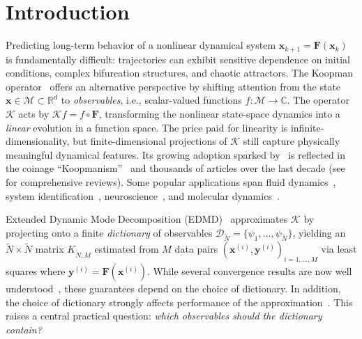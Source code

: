\documentclass{article}
\theoremstyle{plain}
\theoremstyle{definition}
\def\R{\mathbb{R}}
\def\C{\mathbb{C}}
\def\x{\mathbf{x}}
\def\Koop{\mathcal{K}}
\def\Dc{\mathcal{D}}
\def\Mc{\mathcal{M}}
\newcommand{\arXivtag}[1][]{#1}
\begin{document}
	\section{Introduction}\label{sec:intro}
	Predicting long-term behavior of a nonlinear dynamical system $\x_{k+1}=\mathbf{F}(\x_k)$ is fundamentally difficult: trajectories can exhibit sensitive dependence on initial conditions, complex bifurcation structures, and chaotic attractors. 
    The Koopman operator~\cite{koopman1931hamiltonian, Koopman-Neumann1932} offers an alternative perspective by shifting attention from the state $\x \in \Mc \subset \R^d$ to \emph{observables}, i.e., scalar-valued functions $f:\Mc \to \C$. The operator $\Koop$ acts by $\Koop f = f \circ \mathbf{F}$, transforming the nonlinear state-space dynamics into a \emph{linear} evolution in a function space. The price paid for linearity is infinite-dimensionality, but finite-dimensional projections of $\Koop$ still capture physically meaningful dynamical features.
    \arXivtag[Its growing adoption sparked by~\cite{mezic2004PhysicD, mezic2005NonDyn} is reflected in the coinage ``Koopmanism''~\cite{Budisic2012Koopmanism} and thousands of articles over the last decade (see~\cite{Mezic2013AnnRevFluid, Schmid2022DMDreview, Brunton2022SIAMReviews, Colbrook2024-MultiverseDMD, Colbrook2026} for comprehensive reviews). Some popular applications span fluid dynamics~\cite{Mezic2013AnnRevFluid}, system identification~\cite{brunton2016SINDy}, neuroscience~\cite{brunton2016neuro}, and molecular dynamics~\cite{wu2017variational}.]
	
Extended Dynamic Mode Decomposition (EDMD)~\cite{williams2015data} approximates $\Koop$ by projecting onto a finite \emph{dictionary} of observables $\Dc_{\tilde{N}} = \{\psi_1,\ldots,\psi_{\tilde{N}}\}$, yielding an $\tilde{N} \times \tilde{N}$ matrix $K_{\tilde{N},M}$ estimated from $M$ data pairs  $(\mathbf{x}^{(i)},\mathbf{y}^{(i)})_{i=1,\ldots,M}$ via least squares where $\mathbf{y}^{(i)} = \mathbf{F}(\mathbf{x}^{(i)})$. While several convergence results are now well understood~\cite{korda2018convergence, Kostic-NeuRips2023, nuske2023finite, colbrook2024rigorous}, these guarantees depend on the choice of dictionary. \arXivtag[In addition, the choice of dictionary strongly affects performance of the approximation]~\cite{Colbrook2024-MultiverseDMD, otto2021koopman}. This raises a central practical question: \emph{which observables should the dictionary contain?}
	
\end{document}
